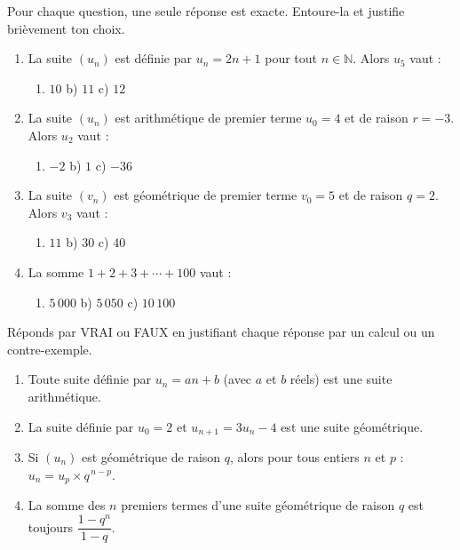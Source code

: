 \documentclass[11pt]{article}
\begin{document}
\begin{exercice}
Pour chaque question, une seule réponse est exacte. Entoure-la et justifie brièvement ton choix.
\begin{enumerate}
\item La suite $(u_n)$ est définie par $u_n = 2n+1$ pour tout $n \in \mathbb{N}$. Alors $u_5$ vaut :
\begin{enumerate}
\item[a)] $10$ \hspace{1cm} b) $11$ \hspace{1cm} c) $12$
\end{enumerate}
\item La suite $(u_n)$ est arithmétique de premier terme $u_0 = 4$ et de raison $r = -3$. Alors $u_2$ vaut :
\begin{enumerate}
\item[a)] $-2$ \hspace{1cm} b) $1$ \hspace{1cm} c) $-36$
\end{enumerate}
\item La suite $(v_n)$ est géométrique de premier terme $v_0 = 5$ et de raison $q = 2$. Alors $v_3$ vaut :
\begin{enumerate}
\item[a)] $11$ \hspace{1cm} b) $30$ \hspace{1cm} c) $40$
\end{enumerate}
\item La somme $1+2+3+\cdots+100$ vaut :
\begin{enumerate}
\item[a)] $5\,000$ \hspace{1cm} b) $5\,050$ \hspace{1cm} c) $10\,100$
\end{enumerate}
\end{enumerate}
\end{exercice}

\begin{exercice}
Réponds par VRAI ou FAUX en justifiant chaque réponse par un calcul ou un contre-exemple.
\begin{enumerate}
\item Toute suite définie par $u_n = an+b$ (avec $a$ et $b$ réels) est une suite arithmétique.
\item La suite définie par $u_0 = 2$ et $u_{n+1} = 3u_n - 4$ est une suite géométrique.
\item Si $(u_n)$ est géométrique de raison $q$, alors pour tous entiers $n$ et $p$ : $u_n = u_p \times q^{\,n-p}$.
\item La somme des $n$ premiers termes d'une suite géométrique de raison $q$ est toujours $\dfrac{1-q^n}{1-q}$.
\end{enumerate}
\end{exercice}
\end{document}
